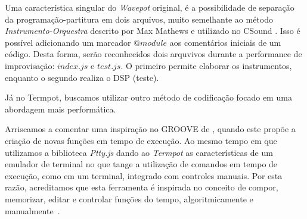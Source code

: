 Uma característica singular do \emph{Wavepot} original, é a possibilidade de separação da programação-partitura em dois arquivos, muito semelhante ao método \emph{Instrumento-Orquestra} descrito por Max Mathews e utilizado no CSound \cite{mathews_digital_1963, di_nunzio_genesi_2010}.
Isso é possível adicionando um marcador $@module$ aos comentários iniciais de um código.
Desta forma, serão reconhecidos dois arquvivos durante a performance de improvisação: $index.js$ e $test.js$.
O primeiro permite elaborar os instrumentos, enquanto o segundo realiza o DSP (teste).

Já no Termpot, buscamos utilizar outro método de codificação focado em uma abordagem mais performática.


Arriscamos a comentar uma inspiração no GROOVE de \cite{mathews_groove_1970,nunzio_groove_2010}, quando este propõe a criação de novas funções em tempo de execução. Ao mesmo tempo em que utilizamos a biblioteca \emph{Ptty.js} dando ao \emph{Termpot} as características de um emulador de terminal no que tange a utilização de comandos em tempo de execução, como em um terminal, integrado com controles manuais.
Por esta razão, acreditamos que esta ferramenta é inspirada no conceito de compor, memorizar, editar e controlar funções do tempo, algoritmicamente e manualmente~\cite{mathews_groove_1970}.



